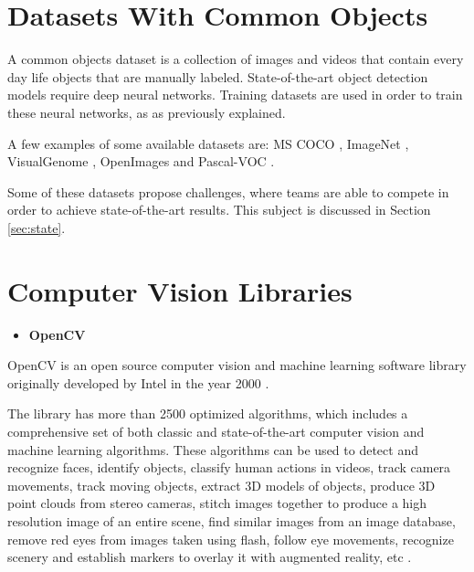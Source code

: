 \newpage

    \section{Datasets With Common Objects}

    \label{sec:dataset}

    \par A common objects dataset is a collection of images and videos that contain every day life objects that are manually labeled.  State-of-the-art object detection models require deep neural networks. Training datasets are used in order to train these neural networks, as as previously explained. 
    

    \par A few examples of some available datasets are:  MS COCO \cite{Lin2014}, ImageNet \cite{Takamitsu1978} , VisualGenome \cite{Language2015}, OpenImages \cite{Kuznetsova2018} and Pascal-VOC \cite{Everingham2010}.

    \par Some of these datasets propose challenges, where teams are able to compete in order to achieve state-of-the-art results. This subject is discussed in Section \ref{sec:state}.



\section{Computer Vision Libraries}
\label{sec:libraries_cv}


    \begin{itemize}
        \item \textbf{OpenCV}
    \end{itemize}

    OpenCV is an open source computer vision and machine learning software library originally developed by Intel in the year 2000 \cite{Culjak2012}.\par

    The library has more than 2500 optimized algorithms, which includes a comprehensive set of both classic and state-of-the-art computer vision and machine learning algorithms. These algorithms can be used to detect and recognize faces, identify objects, classify human actions in videos, track camera movements, track moving objects, extract 3D models of objects, produce 3D point clouds from stereo cameras, stitch images together to produce a high resolution image of an entire scene, find similar images from an image database, remove red eyes from images taken using flash, follow eye movements, recognize scenery and establish markers to overlay it with augmented reality, etc \cite{opencvweb}. \par
    
